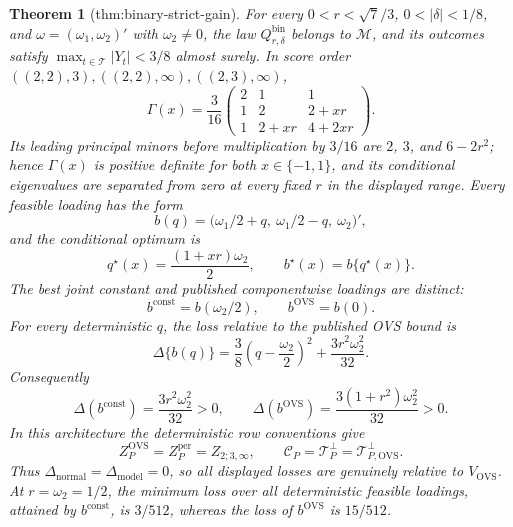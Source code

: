 \documentclass{article}
\newtheorem{theorem}{Theorem}
\begin{document}
\begin{theorem}[thm:binary-strict-gain]\label{thm:binary-strict-gain}
For every \(0<r<\sqrt 7/3\), \(0<|\delta|<1/8\), and \(\omega=(\omega_1,\omega_2)'\) with \(\omega_2\ne0\), the law \(Q^{\mathrm{bin}}_{r,\delta}\) belongs to \(\mathcal M\), and its outcomes satisfy \(\max_{t\in\mathcal T}|Y_t|<3/8\) almost surely. In score order \(((2,2),3),((2,2),\infty),((2,3),\infty)\),
\[
\Gamma(x)=\frac{3}{16}
\begin{pmatrix}
2&1&1\\
1&2&2+xr\\
1&2+xr&4+2xr
\end{pmatrix}.
\]
Its leading principal minors before multiplication by \(3/16\) are \(2\), \(3\), and \(6-2r^2\); hence \(\Gamma(x)\) is positive definite for both \(x\in\{-1,1\}\), and its conditional eigenvalues are separated from zero at every fixed \(r\) in the displayed range. Every feasible loading has the form
\[
b(q)=\bigl(\omega_1/2+q,\ \omega_1/2-q,\ \omega_2\bigr)',
\]
and the conditional optimum is
\[
q^\star(x)=\frac{(1+xr)\omega_2}{2},
\qquad
b^\star(x)=b\{q^\star(x)\}.
\]
The best joint constant and published componentwise loadings are distinct:
\[
b^{\mathrm{const}}=b(\omega_2/2),
\qquad
b^{\mathrm{OVS}}=b(0).
\]
For every deterministic \(q\), the loss relative to the published OVS bound is
\[
\Delta\{b(q)\}
=\frac{3}{8}\left(q-\frac{\omega_2}{2}\right)^2
+\frac{3r^2\omega_2^2}{32}.
\]
Consequently
\[
\Delta(b^{\mathrm{const}})=\frac{3r^2\omega_2^2}{32}>0,
\qquad
\Delta(b^{\mathrm{OVS}})=\frac{3(1+r^2)\omega_2^2}{32}>0.
\]
In this architecture the deterministic row conventions give
\[
Z_P^{\mathrm{OVS}}=Z_P^{\mathrm{per}}=Z_{2;3,\infty},
\qquad
\mathcal C_P=\mathcal T_P^\perp=\mathcal T_{P,\mathrm{OVS}}^\perp.
\]
Thus \(\Delta_{\mathrm{normal}}=\Delta_{\mathrm{model}}=0\), so all displayed losses are genuinely relative to \(V_{\mathrm{OVS}}\). At \(r=\omega_2=1/2\), the minimum loss over all deterministic feasible loadings, attained by \(b^{\mathrm{const}}\), is \(3/512\), whereas the loss of \(b^{\mathrm{OVS}}\) is \(15/512\).
\end{theorem}
\end{document}
